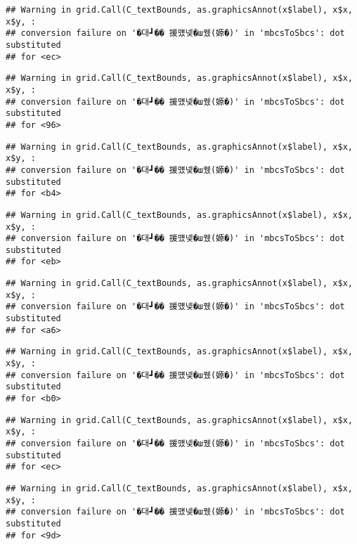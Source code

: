 \documentclass[
]{article}
\begin{document}
\begin{verbatim}
## Warning in grid.Call(C_textBounds, as.graphicsAnnot(x$label), x$x, x$y, :
## conversion failure on '�대┛�� 援먰넻�ш퀬(嫄�)' in 'mbcsToSbcs': dot substituted
## for <ec>
\end{verbatim}

\begin{verbatim}
## Warning in grid.Call(C_textBounds, as.graphicsAnnot(x$label), x$x, x$y, :
## conversion failure on '�대┛�� 援먰넻�ш퀬(嫄�)' in 'mbcsToSbcs': dot substituted
## for <96>
\end{verbatim}

\begin{verbatim}
## Warning in grid.Call(C_textBounds, as.graphicsAnnot(x$label), x$x, x$y, :
## conversion failure on '�대┛�� 援먰넻�ш퀬(嫄�)' in 'mbcsToSbcs': dot substituted
## for <b4>
\end{verbatim}

\begin{verbatim}
## Warning in grid.Call(C_textBounds, as.graphicsAnnot(x$label), x$x, x$y, :
## conversion failure on '�대┛�� 援먰넻�ш퀬(嫄�)' in 'mbcsToSbcs': dot substituted
## for <eb>
\end{verbatim}

\begin{verbatim}
## Warning in grid.Call(C_textBounds, as.graphicsAnnot(x$label), x$x, x$y, :
## conversion failure on '�대┛�� 援먰넻�ш퀬(嫄�)' in 'mbcsToSbcs': dot substituted
## for <a6>
\end{verbatim}

\begin{verbatim}
## Warning in grid.Call(C_textBounds, as.graphicsAnnot(x$label), x$x, x$y, :
## conversion failure on '�대┛�� 援먰넻�ш퀬(嫄�)' in 'mbcsToSbcs': dot substituted
## for <b0>
\end{verbatim}

\begin{verbatim}
## Warning in grid.Call(C_textBounds, as.graphicsAnnot(x$label), x$x, x$y, :
## conversion failure on '�대┛�� 援먰넻�ш퀬(嫄�)' in 'mbcsToSbcs': dot substituted
## for <ec>
\end{verbatim}

\begin{verbatim}
## Warning in grid.Call(C_textBounds, as.graphicsAnnot(x$label), x$x, x$y, :
## conversion failure on '�대┛�� 援먰넻�ш퀬(嫄�)' in 'mbcsToSbcs': dot substituted
## for <9d>
\end{verbatim}
\end{document}

